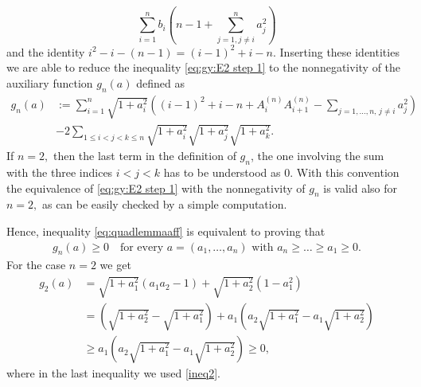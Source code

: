 \documentclass[10pt,leqno]{amsart}
\makeatletter
\numberwithin{Theorem}{section}
\theoremstyle{definition}
\theoremstyle{remark}
\numberwithin{equation}{section}
\numberwithin{equation}{section}
\newenvironment{customproof}[1]{%
  \par\pushQED{\qed}%
  \normalfont\topsep6pt \trivlist
  \item[\hskip\labelsep\itshape
    Proof of #1\@addpunct{.}]\ignorespaces
}{%
  \popQED\endtrivlist\@endpefalse
}
\makeatother
\begin{document}
\begin{customproof}{Theorem \ref{lm:quad_lemma_p=2}}
$$  \sum_{i=1}^n b_i\left(n-1+\sum_{j=1,j\neq i}^n a_j^2\right)
$$
and the identity $i^2-i-(n-1)=(i-1)^2+i-n$. Inserting these identities we are able to
reduce the inequality \eqref{eq:gy:E2 step 1} to the nonnegativity of the auxiliary function $g_n(a)$ defined as
\begin{equation}\begin{split}
g_n(a)&:= \sum_{i=1}^{n} \sqrt{1+a_i^2} \left( (i-1)^2 + i - n + A_i^{(n)} A_{i+1}^{(n)} - \sum_{j=1, \dots, n, \, j \neq i } a_j^2 \right)  \\ &- 2 \sum_{1 \leq i <j<k\leq n} \sqrt{1+a_i^2} \sqrt{1+a_j^2} \sqrt{1+a_k^2}.
\label{eq:gy:gn defin}
\end{split}
\end{equation}
If $n=2,$ then the last term in the definition of $g_n$, the one involving the sum with the three indices $i<j<k$ has to be understood as $0$. With this convention the equivalence of \eqref{eq:gy:E2 step 1} with the nonnegativity of $g_n$ is valid also for $n=2,$ as can be easily checked by a simple computation.

Hence, inequality \eqref{eq:quadlemmaaff} is equivalent to proving that
\begin{align}
    g_n (a) \geq 0 \quad \text{for every $a=(a_1, \dots, a_n)$ with $a_n \geq \dots \geq a_1 \geq 0$}.
\end{align}
For the case $n=2$ we get
\begin{align*}
    g_2(a)&= \sqrt{1+a_1^2} \left( a_1a_2-1\right) + \sqrt{1+a_2^2}\left( 1-a_1^2\right) \\
    &= \left( \sqrt{1+a_2^2}- \sqrt{1+a_1^2}\right) + a_1 \left(a_2\sqrt{1+a_1^2} -a_1\sqrt{1+a_2^2}    \right) \\ &\geq a_1 \left(a_2\sqrt{1+a_1^2} -a_1\sqrt{1+a_2^2}    \right) \geq 0,
\end{align*}
where in the last inequality we used \eqref{ineq2}.




\end{customproof}
\end{document}
